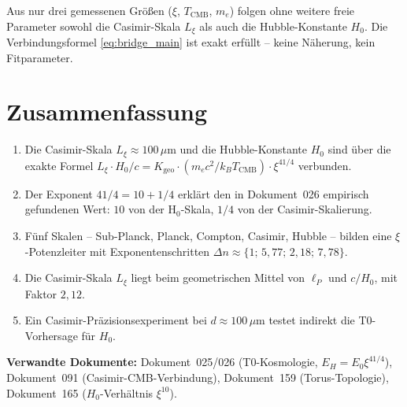 \begin{foundation}
    Aus nur drei gemessenen Größen ($\xi$, $T_\text{CMB}$, $m_e$) folgen
    ohne weitere freie Parameter sowohl die Casimir-Skala $L_\xi$ als auch
    die Hubble-Konstante $H_0$. Die Verbindungsformel \eqref{eq:bridge_main}
    ist exakt erfüllt -- keine Näherung, kein Fitparameter.
\end{foundation}

\section{Zusammenfassung}
\label{sec:zusammenfassung}

\begin{foundation}
    \begin{enumerate}
        \item Die Casimir-Skala $L_\xi \approx 100\,\mu\text{m}$ und die
              Hubble-Konstante $H_0$ sind über die exakte Formel
              $L_\xi \cdot H_0/c = K_\text{geo} \cdot (m_e c^2/k_B T_\text{CMB}) \cdot \xi^{41/4}$
              verbunden.
        \item Der Exponent $41/4 = 10 + 1/4$ erklärt den in Dokument~026
              empirisch gefundenen Wert: $10$ von der H$_0$-Skala,
              $1/4$ von der Casimir-Skalierung.
        \item Fünf Skalen -- Sub-Planck, Planck, Compton, Casimir, Hubble --
              bilden eine $\xi$-Potenzleiter mit Exponentenschritten
              $\Delta n \approx \{1;\,5{,}77;\,2{,}18;\,7{,}78\}$.
        \item Die Casimir-Skala $L_\xi$ liegt beim geometrischen Mittel
              von $\ell_P$ und $c/H_0$, mit Faktor $2{,}12$.
        \item Ein Casimir-Präzisionsexperiment bei $d \approx 100\,\mu\text{m}$
              testet indirekt die T0-Vorhersage für $H_0$.
    \end{enumerate}
\end{foundation}

\vspace{1.5em}
\noindent\textbf{Verwandte Dokumente:}
Dokument~025/026 (T0-Kosmologie, $E_H = E_0\xi^{41/4}$),
Dokument~091 (Casimir-CMB-Verbindung),
Dokument~159 (Torus-Topologie),
Dokument~165 ($H_0$-Verhältnis $\xi^{10}$).
